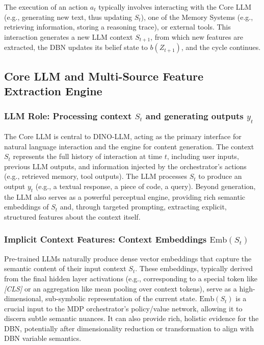 \documentclass[11pt]{article}
\begin{document}
The execution of an action $a_t$ typically involves interacting with the Core LLM (e.g., generating new text, thus updating $S_t$), one of the Memory Systems (e.g., retrieving information, storing a reasoning trace), or external tools. This interaction generates a new LLM context $S_{t+1}$, from which new features are extracted, the DBN updates its belief state to $b(Z_{t+1})$, and the cycle continues.


\subsection{Core LLM and Multi-Source Feature Extraction Engine}
\label{ssec:core_llm_features}

\subsubsection{LLM Role: Processing context $S_t$ and generating outputs $y_t$}
\label{sssec:llm_role}
The Core LLM is central to DINO-LLM, acting as the primary interface for natural language interaction and the engine for content generation. The context $S_t$ represents the full history of interaction at time $t$, including user inputs, previous LLM outputs, and information injected by the orchestrator's actions (e.g., retrieved memory, tool outputs). The LLM processes $S_t$ to produce an output $y_t$ (e.g., a textual response, a piece of code, a query). Beyond generation, the LLM also serves as a powerful perceptual engine, providing rich semantic embeddings of $S_t$ and, through targeted prompting, extracting explicit, structured features about the context itself.

\subsubsection{Implicit Context Features: Context Embeddings $\text{Emb}(S_t)$}
\label{sssec:implicit_features}
Pre-trained LLMs naturally produce dense vector embeddings that capture the semantic content of their input context $S_t$. These embeddings, typically derived from the final hidden layer activations (e.g., corresponding to a special token like \emph{[CLS]} or an aggregation like mean pooling over context tokens), serve as a high-dimensional, sub-symbolic representation of the current state. $\text{Emb}(S_t)$ is a crucial input to the MDP orchestrator's policy/value network, allowing it to discern subtle semantic nuances. It can also provide rich, holistic evidence for the DBN, potentially after dimensionality reduction or transformation to align with DBN variable semantics.
\end{document}
